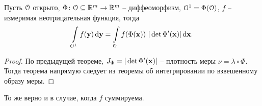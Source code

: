 \begin{theorem}
    Пусть $\mathcal{O}$ открыто, $\Phi \colon \mathcal{O} \subseteq \mathbb{R}^m \to \mathbb{R}^m$ -- диффеоморфизм,
    $\mathcal{O}^1 = \Phi(\mathcal{O})$, $f$ -- измеримая неотрицательная функция, тогда
    \[
        \int\limits_{\mathcal{O}^1}{f(\mathbf{y}) \,\mathrm{d} \mathbf{y}} = \int\limits_{\mathcal{O}}{f(\Phi(\mathbf{x}))~ |\det{\Phi'(\mathbf{x})}| \,\mathrm{d} \mathbf{x}}
    .\] 
\end{theorem}
\begin{proof}
    По предыдущей теореме, $J_\Phi = |\det{\Phi'(\mathbf{x})}|$ -- плотность меры $\nu = \lambda \circ \Phi$.
    Тогда теорема напрямую следует из теоремы об интегрировании по взвешенному образу меры.
\end{proof}

\begin{remark}
    То же верно и в случае, когда $f$ суммируема.
\end{remark}

